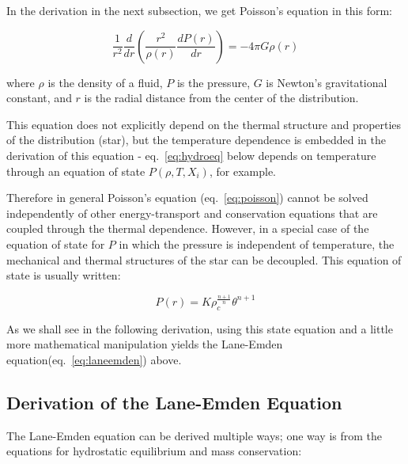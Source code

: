 \documentclass{article}
\begin{document}
        In the derivation in the next subsection, we get Poisson's equation in
        this form:

        \begin{equation}
            \label{eq:poisson}
            \frac{1}{r^2} \frac{d}{dr} \left( \frac{r^2}{\rho(r)}\frac{dP(r)}{dr} \right) = -4 \pi G\rho(r)
        \end{equation}

        where \(\rho\) is the density of a fluid, \(P\) is the pressure, \(G\)
        is Newton's gravitational constant, and \(r\) is the radial distance
        from the center of the distribution.

        This equation does not explicitly depend on the thermal structure and
        properties of the distribution (star), but the temperature dependence is
        embedded in the derivation of this equation - eq.~\ref{eq:hydroeq} below
        depends on temperature through an equation of state \(P(\rho,T,X_i)\),
        for example.

        Therefore in general Poisson's equation (eq.~\ref{eq:poisson}) cannot be
        solved independently of other energy-transport and conservation
        equations that are coupled through the thermal dependence. However, in a
        special case of the equation of state for \(P\) in which the pressure is
        independent of temperature, the mechanical and thermal structures of the
        star can be decoupled. This equation of state is usually
        written\cite[p.177]{leblanc2010}:

        \begin{equation}
            \label{eq:specstate}
            P(r) = K\rho_c^{\frac{n+1}{n}}\theta^{n+1}
        \end{equation}

        As we shall see in the following derivation, using this state equation
        and a little more mathematical manipulation yields the Lane-Emden
        equation(eq.~\ref{eq:laneemden}) above.

        \subsection{Derivation of the Lane-Emden
        Equation\cite[pp.176--179]{leblanc2010}}

            The Lane-Emden equation can be derived multiple ways; one way is from
            the equations for hydrostatic equilibrium and mass conservation:
\end{document}
